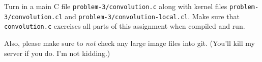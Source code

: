 \documentclass[11pt]{article}
\begin{document}
Turn in a main C file \texttt{problem-3/convolution.c} along with
kernel files \texttt{problem-3/convolution.cl} and
\texttt{problem-3/convolution-local.cl}. Make sure that
\texttt{convolution.c} exercises all parts of this assignment when
compiled and run.

Also, please make sure to \emph{not} check any large image files
into git. (You'll kill my server if you do. I'm not kidding.)
\end{document}
